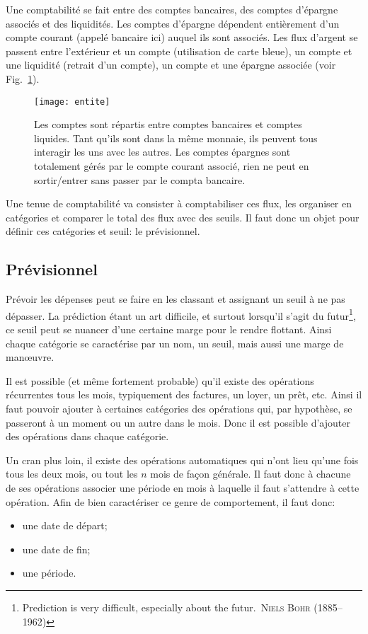 Une comptabilité se fait entre des comptes bancaires, des comptes d'épargne
associés et des liquidités. Les comptes d'épargne dépendent entièrement d'un
compte courant (appelé bancaire ici) auquel ils sont associés. Les flux d'argent
se passent entre l'extérieur et un compte (utilisation de carte bleue), un compte
et une liquidité (retrait d'un compte), un compte et une épargne associée
(voir Fig.~\ref{compta:comptes}).
\begin{figure}
\centering
\texttt{[image: entite]}
\caption{\label{compta:comptes}Les comptes sont répartis entre comptes bancaires et
        comptes liquides. Tant qu'ils sont dans la même monnaie, ils peuvent tous
        interagir les uns avec les autres. Les comptes épargnes sont totalement gérés
        par le compte courant associé, rien ne peut en sortir/entrer sans passer
        par le compta bancaire.}
\end{figure}

Une tenue de comptabilité va consister à comptabiliser ces flux, les organiser
en catégories et comparer le total des flux avec des seuils. Il faut donc
un objet pour définir ces catégories et seuil: le prévisionnel.

\subsection{Prévisionnel}

Prévoir les dépenses peut se faire en les classant et assignant
un seuil à ne pas dépasser. La prédiction étant un art difficile,
et surtout lorsqu'il s'agit du futur\footnote{\og Prediction is very
difficult, especially about the futur.\fg\ \textsc{Niels Bohr}
(1885--1962)}, ce seuil peut se nuancer d'une certaine marge
pour le rendre flottant.
Ainsi chaque catégorie se caractérise par un nom, un seuil, mais
aussi une marge de man\oe uvre.

Il est possible (et même fortement probable) qu'il existe des
opérations récurrentes tous les mois, typiquement des factures, 
un loyer, un prêt, etc. Ainsi il faut pouvoir ajouter
à certaines catégories des opérations qui, par hypothèse,
se passeront à un moment ou un autre dans le mois.
Donc il est possible d'ajouter des opérations dans chaque
catégorie.

Un cran plus loin, il existe des opérations automatiques qui n'ont lieu qu'une
fois tous les deux mois, ou tout les $n$ mois de façon générale.
Il faut donc à chacune de ses opérations associer une période en
mois à laquelle il faut s'attendre à cette opération. Afin de bien
caractériser ce genre de comportement, il faut donc:
\begin{itemize}
\item une date de départ;
\item une date de fin;
\item une période.
\end{itemize}

